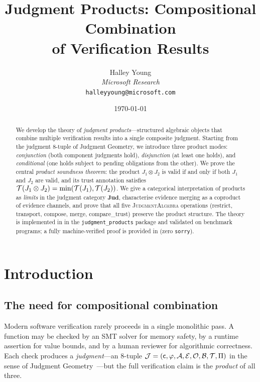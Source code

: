 \documentclass[11pt]{article}
\title{\textbf{Judgment Products: Compositional Combination\\
       of Verification Results}}
\author{%
  Halley Young\\
  \textit{Microsoft Research}\\
  \texttt{halleyyoung@microsoft.com}
}
\date{\today}
\newcommand{\Jprod}{\mathbin{\otimes}}            %
\newcommand{\JprodN}[2]{#1 \Jprod #2}             %
\newcommand{\ProdCat}{\mathbf{Jud}}               %
\begin{document}
\maketitle

\begin{abstract}
We develop the theory of \emph{judgment products}---structured algebraic
objects that combine multiple verification results into a single composite
judgment.  Starting from the judgment 8-tuple of Judgment Geometry, we
introduce three product modes: \emph{conjunction} (both component judgments
hold), \emph{disjunction} (at least one holds), and \emph{conditional}
(one holds subject to pending obligations from the other).  We prove the
central \emph{product soundness theorem}: the product $\JprodN{J_1}{J_2}$
is valid if and only if both $J_1$ and $J_2$ are valid, and its trust
annotation satisfies $\trust(\JprodN{J_1}{J_2}) = \min(\trust(J_1),
\trust(J_2))$.  We give a categorical interpretation of products as
\emph{limits} in the judgment category $\ProdCat$, characterise evidence
merging as a coproduct of evidence channels, and prove that all five
\textsc{JudgmentAlgebra} operations (restrict, transport, compose, merge,
compare\_trust) preserve the product structure.  The theory is implemented
in \Python{} in the \texttt{judgment\_products} package and validated on
\ppFortyFourTotalPrograms{} benchmark programs; a fully machine-verified proof is provided
in \LEAN{} (zero \texttt{sorry}).
\end{abstract}

\newpage

\section{Introduction}\label{sec:intro}

\subsection{The need for compositional combination}

Modern software verification rarely proceeds in a single monolithic pass.
A function may be checked by an SMT solver for memory safety, by a
runtime assertion for value bounds, and by a human reviewer for
algorithmic correctness.  Each check produces a \emph{judgment}---an
8-tuple $\mathcal{J} = (\mathsf{c}, \varphi, \mathcal{A}, \mathcal{E}, \mathcal{O}, \mathcal{B}, \mathcal{T},
\Pi)$ in the sense of Judgment Geometry~\cite{jugeo02}---but the
full verification claim is the \emph{product} of all three.
\end{document}
